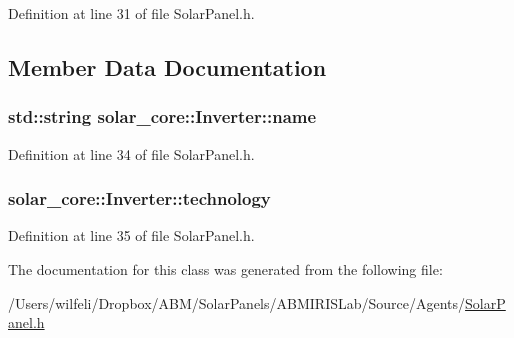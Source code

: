 Definition at line 31 of file Solar\+Panel.\+h.



\subsection{Member Data Documentation}
\hypertarget{classsolar__core_1_1_inverter_a0a63c42804f6d96c298f11c1425075d2}{}
\subsubsection[{name}]{\setlength{\rightskip}{0pt plus 5cm}std\+::string solar\+\_\+core\+::\+Inverter\+::name}\label{classsolar__core_1_1_inverter_a0a63c42804f6d96c298f11c1425075d2}


Definition at line 34 of file Solar\+Panel.\+h.

\hypertarget{classsolar__core_1_1_inverter_a793b76816cee47c3348f8854b0fec9b1}{}
\subsubsection[{technology}]{ solar\+\_\+core\+::\+Inverter\+::technology}\label{classsolar__core_1_1_inverter_a793b76816cee47c3348f8854b0fec9b1}


Definition at line 35 of file Solar\+Panel.\+h.



The documentation for this class was generated from the following file\+:\begin{DoxyCompactItemize}
\item 
/\+Users/wilfeli/\+Dropbox/\+A\+B\+M/\+Solar\+Panels/\+A\+B\+M\+I\+R\+I\+S\+Lab/\+Source/\+Agents/\hyperlink{_solar_panel_8h}{Solar\+Panel.\+h}\end{DoxyCompactItemize}
